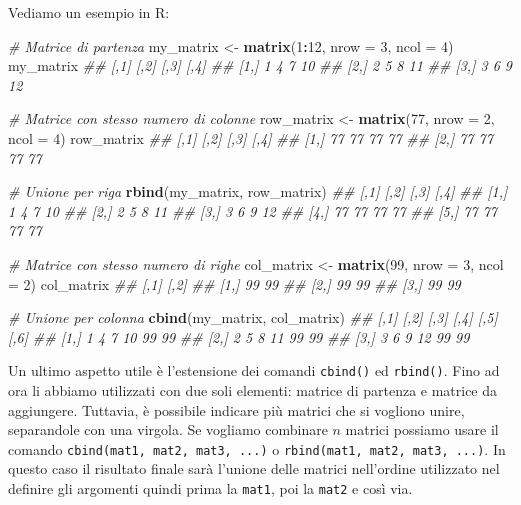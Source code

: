 \documentclass[
]{book}
\newenvironment{Shaded}{\begin{snugshade}}{\end{snugshade}}
\newcommand{\CommentTok}[1]{\textcolor[rgb]{0.56,0.35,0.01}{\textit{#1}}}
\newcommand{\DataTypeTok}[1]{\textcolor[rgb]{0.13,0.29,0.53}{#1}}
\newcommand{\DecValTok}[1]{\textcolor[rgb]{0.00,0.00,0.81}{#1}}
\newcommand{\KeywordTok}[1]{\textcolor[rgb]{0.13,0.29,0.53}{\textbf{#1}}}
\newcommand{\NormalTok}[1]{#1}
\newcommand{\OperatorTok}[1]{\textcolor[rgb]{0.81,0.36,0.00}{\textbf{#1}}}
\newcommand{\StringTok}[1]{\textcolor[rgb]{0.31,0.60,0.02}{#1}}
\begin{document}
Vediamo un esempio in R:

\begin{Shaded}
\begin{Highlighting}[]
\CommentTok{# Matrice di partenza}
\NormalTok{my_matrix <-}\StringTok{ }\KeywordTok{matrix}\NormalTok{(}\DecValTok{1}\OperatorTok{:}\DecValTok{12}\NormalTok{, }\DataTypeTok{nrow =} \DecValTok{3}\NormalTok{, }\DataTypeTok{ncol =} \DecValTok{4}\NormalTok{)}
\NormalTok{my_matrix}
\CommentTok{##      [,1] [,2] [,3] [,4]}
\CommentTok{## [1,]    1    4    7   10}
\CommentTok{## [2,]    2    5    8   11}
\CommentTok{## [3,]    3    6    9   12}

\CommentTok{# Matrice con stesso numero di colonne}
\NormalTok{row_matrix <-}\StringTok{ }\KeywordTok{matrix}\NormalTok{(}\DecValTok{77}\NormalTok{, }\DataTypeTok{nrow =} \DecValTok{2}\NormalTok{, }\DataTypeTok{ncol =} \DecValTok{4}\NormalTok{)}
\NormalTok{row_matrix}
\CommentTok{##      [,1] [,2] [,3] [,4]}
\CommentTok{## [1,]   77   77   77   77}
\CommentTok{## [2,]   77   77   77   77}

\CommentTok{# Unione per riga}
\KeywordTok{rbind}\NormalTok{(my_matrix, row_matrix)}
\CommentTok{##      [,1] [,2] [,3] [,4]}
\CommentTok{## [1,]    1    4    7   10}
\CommentTok{## [2,]    2    5    8   11}
\CommentTok{## [3,]    3    6    9   12}
\CommentTok{## [4,]   77   77   77   77}
\CommentTok{## [5,]   77   77   77   77}


\CommentTok{# Matrice con stesso numero di righe}
\NormalTok{col_matrix <-}\StringTok{ }\KeywordTok{matrix}\NormalTok{(}\DecValTok{99}\NormalTok{, }\DataTypeTok{nrow =} \DecValTok{3}\NormalTok{, }\DataTypeTok{ncol =} \DecValTok{2}\NormalTok{)}
\NormalTok{col_matrix}
\CommentTok{##      [,1] [,2]}
\CommentTok{## [1,]   99   99}
\CommentTok{## [2,]   99   99}
\CommentTok{## [3,]   99   99}

\CommentTok{# Unione per colonna}
\KeywordTok{cbind}\NormalTok{(my_matrix, col_matrix)}
\CommentTok{##      [,1] [,2] [,3] [,4] [,5] [,6]}
\CommentTok{## [1,]    1    4    7   10   99   99}
\CommentTok{## [2,]    2    5    8   11   99   99}
\CommentTok{## [3,]    3    6    9   12   99   99}
\end{Highlighting}
\end{Shaded}

Un ultimo aspetto utile è l'estensione dei comandi \texttt{cbind()} ed \texttt{rbind()}. Fino ad ora li abbiamo utilizzati con due soli elementi: matrice di partenza e matrice da aggiungere. Tuttavia, è possibile indicare più matrici che si vogliono unire, separandole con una virgola. Se vogliamo combinare \(n\) matrici possiamo usare il comando \texttt{cbind(mat1,\ mat2,\ mat3,\ ...)} o \texttt{rbind(mat1,\ mat2,\ mat3,\ ...)}. In questo caso il risultato finale sarà l'unione delle matrici nell'ordine utilizzato nel definire gli argomenti quindi prima la \texttt{mat1}, poi la \texttt{mat2} e così via.
\end{document}
